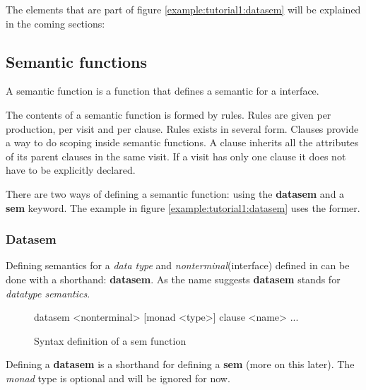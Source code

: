 The elements that are part of figure \ref{example:tutorial1:datasem} will be explained in the coming sections:

\subsection{Semantic functions}
\label{semantics}
A semantic function is a function that defines a semantic for a interface. %

The contents of a semantic function is formed by rules. Rules are given per production, per visit and per clause. Rules exists in several form. Clauses provide a way to do scoping inside semantic functions. A clause inherits all the attributes of its parent clauses in the same visit. If a visit has only one clause it does not have to be explicitly declared. 

There are two ways of defining a semantic function: using the \textbf{datasem} and a \textbf{sem} keyword. The example in figure \ref{example:tutorial1:datasem} uses the former.

\subsubsection{Datasem}
Defining semantics for a \emph{data type} and \emph{nonterminal}(interface) defined in \rcore can be done with a shorthand: \textbf{datasem}. As the name suggests \textbf{datasem} stands for \emph{datatype semantics}. %

\begin{figure}[!h]

\caption{Syntax definition of a sem function}
\label{datasem:syntax}\begin{code}
datasem <nonterminal> [monad <type>]
    {clause <name>
        ...
    }
\end{code}
\end{figure}

Defining a \textbf{datasem} is a shorthand for defining a \textbf{sem} (more on this later). The \emph{monad} type is optional and will be ignored for now. %

